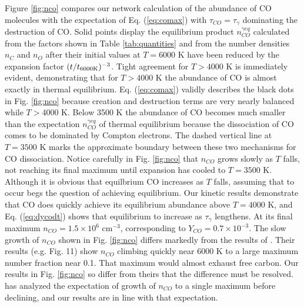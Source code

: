\documentclass[manuscript]{aastex}
\newcommand{\ncogeq}{n_{CO}^{\gamma eq}}
\begin{document}
\begin{CJK*}{UTF8}{gbsn}
Figure \ref{fig:nco}
compares our network calculation of the abundance of CO molecules
with the expectation of Eq. (\ref{eq:comax}) with $\tau_{CO} = \tau_\gamma$
dominating the destruction of CO.
Solid points display the equilibrium product $\ncogeq$ calculated from the
factors shown in Table \ref{tab:quantities}
and from the number densities $n_C$ and $n_O$ after
their initial values at $T=6000$ K have been reduced by the expansion factor
$(t/t_{6000 {\rm K}})^{-3}$.
Tight agreement for $T > 4000$ K is immediately evident,
demonstrating that for $T > 4000$ K the abundance of CO is almost exactly in
thermal equilibrium. Eq. (\ref{eq:comax}) validly describes the black dots in
Fig. \ref{fig:nco} because creation and destruction terms are very nearly
balanced while $T > 4000$ K.
Below 3500 K the abundance of CO becomes much smaller than
the expectation $\ncogeq$ of thermal equilibrium because the dissociation of CO
comes to be dominated by Compton electrons. The dashed vertical line at
$T=3500$ K marks the approximate boundary between these two mechanisms for CO
dissociation. Notice carefully in Fig. \ref{fig:nco}
that $n_{CO}$ grows slowly as $T$ falls, not reaching
its final maximum until expansion has cooled to $T=3500$ K.
Although it is obvious that equilbrium CO increases as $T$ falls,
assuming that to occur begs the question of achieving equilibrium.
Our kinetic results demonstrate that CO does quickly achieve its
equilibrium abundance above $T = 4000$ K, and Eq. (\ref{eq:dycodt})
shows that equilibrium to increase as $\tau_\gamma$ lengthens.
At its final maximum $n_{CO} = 1.5 \times 10^6$ cm$^{-3}$,
corresponding to $Y_{CO} = 0.7 \times 10^{-3}$. The slow growth of $n_{CO}$
shown in Fig. \ref{fig:nco} differs markedly from the results of
\citet{2009ApJ...703..642C}.
Their results (e.g. Fig. 11) show $n_{CO}$ climbing quickly near 6000 K
to a large
maximum number fraction near 0.1. That maximum would almost exhaust free
carbon. Our results in Fig. \ref{fig:nco}
so differ from theirs that the difference
must be resolved. \citet{2013ApJ...762....5C} has analyzed the expectation
of growth of $n_{CO}$ to a single maximum before declining, and our results are
in line with that expectation. 


\end{CJK*}
\end{document}
